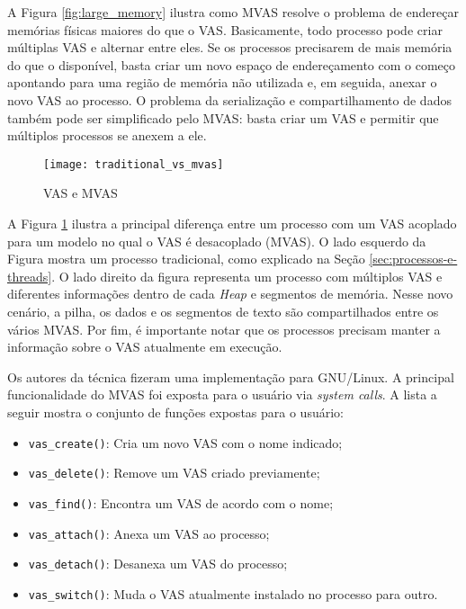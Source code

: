 A Figura \ref{fig:large_memory} ilustra como MVAS resolve o problema de
endereçar memórias físicas maiores do que o VAS. Basicamente, todo processo
pode criar múltiplas VAS e alternar entre eles. Se os processos precisarem de
mais memória do que o disponível, basta criar um novo espaço de endereçamento
com o começo apontando para uma região de memória não utilizada e, em seguida,
anexar o novo VAS ao processo. O problema da serialização e compartilhamento de
dados também pode ser simplificado pelo MVAS: basta criar um VAS e permitir que
múltiplos processos se anexem a ele.

\begin{figure}[!h]
  \centering
  \texttt{[image: traditional\_vs\_mvas]} 
	\caption[VAS e MVAS]{VAS e MVAS \citep{spacejmp}}
  \label{fig:traditional_vs_mvas} 
\end{figure}

A Figura \ref{fig:traditional_vs_mvas} ilustra a principal diferença entre um
processo com um VAS acoplado para um modelo no qual o VAS é desacoplado
(MVAS). O lado esquerdo da Figura mostra um processo tradicional, como explicado
na Seção \ref{sec:processos-e-threads}. O lado direito da figura representa um
processo com múltiplos VAS e diferentes informações dentro de cada \emph{Heap}
e segmentos de memória. Nesse novo cenário, a pilha, os dados e os segmentos
de texto são compartilhados entre os vários MVAS. Por fim, é importante
notar que os processos precisam manter a informação sobre o VAS atualmente em
execução.
 
Os autores da técnica fizeram uma implementação para GNU/Linux. A principal
funcionalidade do MVAS foi exposta para o usuário via \emph{system calls}. A
lista a seguir mostra o conjunto de funções expostas para o usuário:

\begin{itemize}
  \item \texttt{vas\_create()}: Cria um novo VAS com o nome indicado;
  \item \texttt{vas\_delete()}: Remove um VAS criado previamente;
  \item \texttt{vas\_find()}: Encontra um VAS de acordo com o nome;
  \item \texttt{vas\_attach()}: Anexa um VAS ao processo;
  \item \texttt{vas\_detach()}: Desanexa um VAS do processo;
  \item \texttt{vas\_switch()}: Muda o VAS atualmente instalado no processo para outro.
\end{itemize}

